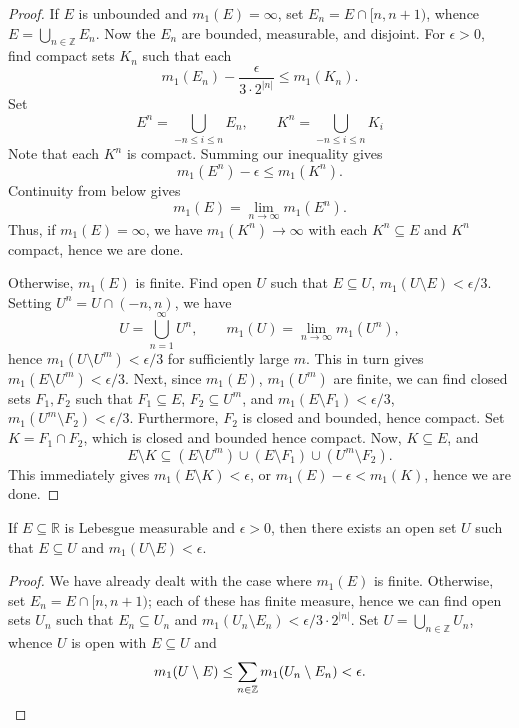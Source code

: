 \documentclass[11pt]{article}
\newcommand{\R}{\mathbb{R}}
\newcommand{\Z}{\mathbb{Z}}
\theoremstyle{definition}
\theoremstyle{remark}
\numberwithin{equation}{section}
\begin{document}
\begin{proof}
        If $E$ is unbounded and $m_1(E) = \infty$, set $E_n = E \cap [n, n + 1)$,
        whence $E = \bigcup_{n \in \Z} E_n$. Now the $E_n$ are bounded, measurable,
        and disjoint. For $\epsilon > 0$, find compact sets $K_n$ such that each \[
            m_1(E_n) - \frac{\epsilon}{3\cdot 2^{|n|}} \leq m_1(K_n).
        \] Set \[
            E^n = \bigcup_{-n \leq i \leq n} E_n, \qquad
            K^n = \bigcup_{-n \leq i \leq n} K_i
        \] Note that each $K^n$ is compact. Summing our inequality gives \[
            m_1(E^n) - \epsilon \leq m_1(K^n).
        \] Continuity from below gives \[
            m_1(E) = \lim_{n \to \infty} m_1(E^n).
        \] Thus, if $m_1(E) = \infty$, we have $m_1(K^n) \to \infty$ with each $K^n
        \subseteq E$ and $K^n$ compact, hence we are done.

        Otherwise, $m_1(E)$ is finite. Find open $U$ such that $E \subseteq U$,
        $m_1(U\setminus E) < \epsilon/3$. Setting $U^n = U \cap (-n, n)$, we have \[
            U = \bigcup_{n = 1}^\infty U^n, \qquad
            m_1(U) = \lim_{n \to \infty} m_1(U^n),
        \] hence $m_1(U\setminus U^m) < \epsilon/3$ for sufficiently large $m$. This
        in turn gives $m_1(E\setminus U^m) < \epsilon/3$. Next, since $m_1(E)$,
        $m_1(U^m)$ are finite, we can find closed sets $F_1, F_2$ such that $F_1
        \subseteq E$, $F_2 \subseteq U^m$, and $m_1(E\setminus F_1) < \epsilon/3$,
        $m_1(U^m\setminus F_2) < \epsilon/3$. Furthermore, $F_2$ is closed and
        bounded, hence compact. Set $K = F_1 \cap F_2$, which is closed and bounded
        hence compact. Now, $K \subseteq E$, and \[
            E\setminus K \subseteq (E\setminus U^m) \cup (E \setminus F_1) \cup
            (U^m\setminus F_2).
        \] This immediately gives $m_1(E\setminus K) < \epsilon$, or $m_1(E) -
        \epsilon < m_1(K)$, hence we are done.
    \end{proof}

    \begin{corollary}
        If $E \subseteq \R$ is Lebesgue measurable and $\epsilon > 0$, then there
        exists an open set $U$ such that $E \subseteq U$ and $m_1(U \setminus E) <
        \epsilon$.
    \end{corollary}
    \begin{proof}
        We have already dealt with the case where $m_1(E)$ is finite. Otherwise, set
        $E_n = E \cap [n, n + 1)$; each of these has finite measure, hence we can
        find open sets $U_n$ such that $E_n \subseteq U_n$ and $m_1(U_n\setminus E_n)
        < \epsilon / 3\cdot 2^{|n|}$. Set $U = \bigcup_{n \in \Z} U_n$, whence $U$ is
        open with $E \subseteq U$ and \[
            m_1(U\setminus E) \leq \sum_{n \in \Z} m_1(U_n\setminus E_n) < \epsilon.
            \qedhere
        \]
    \end{proof}
\end{document}
